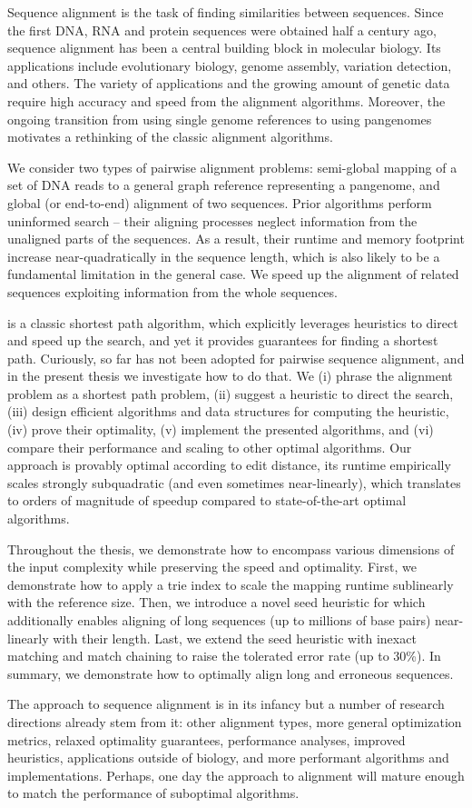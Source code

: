 Sequence alignment is the task of finding similarities between sequences. Since
the first DNA, RNA and protein sequences were obtained half a century ago,
sequence alignment has been a central building block in molecular biology. Its
applications include evolutionary biology, genome assembly, variation detection,
and others. The variety of applications and the growing amount of genetic data
require high accuracy and speed from the alignment algorithms. Moreover, the
ongoing transition from using single genome references to using pangenomes
motivates a rethinking of the classic alignment algorithms.

We consider two types of pairwise alignment problems: semi-global mapping of a
set of DNA reads to a general graph reference representing a pangenome, and
global (or end-to-end) alignment of two sequences. Prior algorithms perform
uninformed search – their aligning processes neglect  information from the
unaligned parts of the sequences. As a result, their runtime and memory
footprint increase near-quadratically in the sequence length, which is also
likely to be a fundamental limitation in the general case. We speed up the
alignment of related sequences exploiting information from the whole sequences.

\A is a classic shortest path algorithm, which explicitly leverages heuristics
to direct and speed up the search, and yet it provides guarantees for finding a
shortest path. Curiously, so far \A has not been adopted for pairwise sequence
alignment, and in the present thesis we investigate how to do that. We (i)
phrase the alignment problem as a shortest path problem, (ii) suggest a
heuristic to direct the \A search, (iii) design efficient algorithms and data
structures for computing the heuristic, (iv) prove their optimality, (v)
implement the presented algorithms, and (vi) compare their performance and
scaling to other optimal algorithms. Our approach is provably optimal according
to edit distance, its runtime empirically scales strongly subquadratic (and even
sometimes near-linearly), which translates to orders of magnitude of speedup
compared to state-of-the-art optimal algorithms.

Throughout the thesis, we demonstrate how to encompass various dimensions of the
input complexity while preserving the speed and optimality. First, we
demonstrate how to apply a trie index to scale the mapping runtime sublinearly
with the reference size. Then, we introduce a novel seed heuristic for \A which
additionally enables aligning of long sequences (up to millions of base pairs)
near-linearly with their length. Last, we extend the seed heuristic with inexact
matching and match chaining to raise the tolerated error rate (up to 30\%). In
summary, we demonstrate how to optimally align long and erroneous sequences.

The \A approach to sequence alignment is in its infancy but a number of research
directions already stem from it: other alignment types, more general
optimization metrics, relaxed optimality guarantees, performance analyses,
improved heuristics, applications outside of biology, and more performant
algorithms and implementations. Perhaps, one day the \A approach to alignment
will mature enough to match the performance of suboptimal algorithms.
